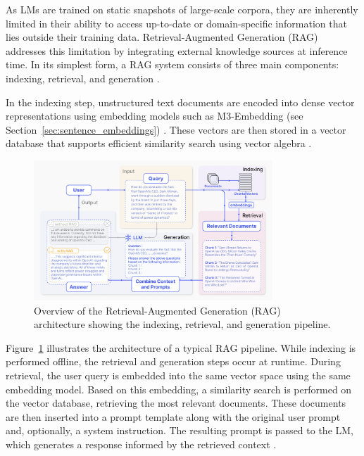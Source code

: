 \documentclass[a4paper,oneside,bibliography=totoc]{scrbook}
\begin{document}
As \acp{LM} are trained on static snapshots of large-scale corpora, they are inherently limited in their ability to access up-to-date or domain-specific information that lies outside their training data. Retrieval-Augmented Generation (\ac{RAG}) addresses this limitation by integrating external knowledge sources at inference time. In its simplest form, a \ac{RAG} system consists of three main components: indexing, retrieval, and generation \cite{Gao2024}.

In the indexing step, unstructured text documents are encoded into dense vector representations using embedding models such as M3-Embedding (see Section~\ref{sec:sentence_embeddings}) \cite{Gao2024}. These vectors are then stored in a vector database that supports efficient similarity search using vector algebra \cite{Gao2024,Pan2024}.

\begin{figure}[t]
  \centering
  \includegraphics[width=0.8\textwidth]{figures/RAG.png}
  \caption[Overview of the Retrieval-Augmented Generation (RAG) architecture showing the indexing, retrieval, and generation pipeline]{Overview of the Retrieval-Augmented Generation (RAG) architecture showing the indexing, retrieval, and generation pipeline. \cite{Gao2024}}
  \label{fig:rag}
\end{figure}

Figure~\ref{fig:rag} illustrates the architecture of a typical RAG pipeline. While indexing is performed offline, the retrieval and generation steps occur at runtime. During retrieval, the user query is embedded into the same vector space using the same embedding model. Based on this embedding, a similarity search is performed on the vector database, retrieving the most relevant documents. These documents are then inserted into a prompt template along with the original user prompt and, optionally, a system instruction. The resulting prompt is passed to the \ac{LM}, which generates a response informed by the retrieved context \cite{Gao2024}.
\end{document}
